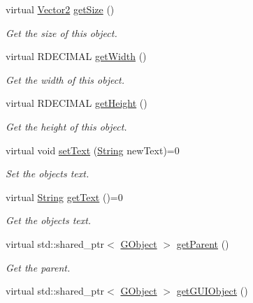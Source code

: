 \begin{DoxyCompactItemize}
virtual \hyperlink{class_rad_j_a_v_1_1_vector2}{Vector2} \hyperlink{class_rad_j_a_v_1_1_g_u_i_1_1_g_object_a330659366f5b734fc7d84a8a60ec24e5}{get\+Size} ()
\begin{DoxyCompactList}\small\item\em Get the size of this object. \end{DoxyCompactList}\item 
virtual R\+D\+E\+C\+I\+M\+AL \hyperlink{class_rad_j_a_v_1_1_g_u_i_1_1_g_object_a8143f4664e12b03dfe939cd9bf23d5eb}{get\+Width} ()
\begin{DoxyCompactList}\small\item\em Get the width of this object. \end{DoxyCompactList}\item 
virtual R\+D\+E\+C\+I\+M\+AL \hyperlink{class_rad_j_a_v_1_1_g_u_i_1_1_g_object_a333cb3617fcc8d3446c67ea12690d63f}{get\+Height} ()
\begin{DoxyCompactList}\small\item\em Get the height of this object. \end{DoxyCompactList}\item 
virtual void \hyperlink{class_rad_j_a_v_1_1_g_u_i_1_1_g_object_a361fe7962341e8d0562b39d28ad1b465}{set\+Text} (\hyperlink{class_rad_j_a_v_1_1_string}{String} new\+Text)=0
\begin{DoxyCompactList}\small\item\em Set the object\textquotesingle{}s text. \end{DoxyCompactList}\item 
virtual \hyperlink{class_rad_j_a_v_1_1_string}{String} \hyperlink{class_rad_j_a_v_1_1_g_u_i_1_1_g_object_a623610eb55210a2f88afbdeda31f088e}{get\+Text} ()=0
\begin{DoxyCompactList}\small\item\em Get the object\textquotesingle{}s text. \end{DoxyCompactList}\item 
virtual std\+::shared\+\_\+ptr$<$ \hyperlink{class_rad_j_a_v_1_1_g_u_i_1_1_g_object}{G\+Object} $>$ \hyperlink{class_rad_j_a_v_1_1_g_u_i_1_1_g_object_a81dfe857a4bd89de9214982d30a28ce5}{get\+Parent} ()
\begin{DoxyCompactList}\small\item\em Get the parent. \end{DoxyCompactList}\item 
virtual std\+::shared\+\_\+ptr$<$ \hyperlink{class_rad_j_a_v_1_1_g_u_i_1_1_g_object}{G\+Object} $>$ \hyperlink{class_rad_j_a_v_1_1_g_u_i_1_1_g_object_abdd66443a236cf9b0d6f76d826ce4565}{get\+G\+U\+I\+Object} ()

\end{DoxyCompactItemize}
